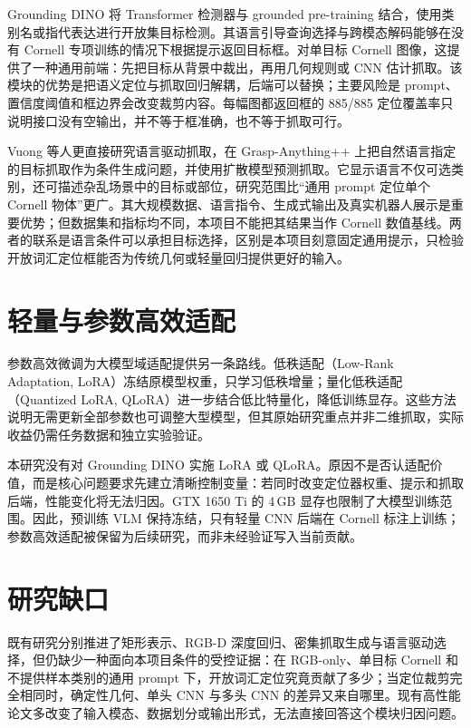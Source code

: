 \documentclass{l4proj}
\begin{document}
Grounding DINO 将 Transformer 检测器与 grounded pre-training 结合，使用类别名或指代表达进行开放集目标检测\citep{liu2023grounding}。其语言引导查询选择与跨模态解码能够在没有 Cornell 专项训练的情况下根据提示返回目标框。对单目标 Cornell 图像，这提供了一种通用前端：先把目标从背景中裁出，再用几何规则或 CNN 估计抓取。该模块的优势是把语义定位与抓取回归解耦，后端可以替换；主要风险是 prompt、置信度阈值和框边界会改变裁剪内容。每幅图都返回框的 885/885 定位覆盖率只说明接口没有空输出，并不等于框准确，也不等于抓取可行。

Vuong 等人更直接研究语言驱动抓取，在 Grasp-Anything++ 上把自然语言指定的目标抓取作为条件生成问题，并使用扩散模型预测抓取\citep{vuong2024language}。它显示语言不仅可选类别，还可描述杂乱场景中的目标或部位，研究范围比“通用 prompt 定位单个 Cornell 物体”更广。其大规模数据、语言指令、生成式输出及真实机器人展示是重要优势；但数据集和指标均不同，本项目不能把其结果当作 Cornell 数值基线。两者的联系是语言条件可以承担目标选择，区别是本项目刻意固定通用提示，只检验开放词汇定位框能否为传统几何或轻量回归提供更好的输入。

\section{轻量与参数高效适配}
参数高效微调为大模型域适配提供另一条路线。低秩适配（Low-Rank Adaptation, LoRA）冻结原模型权重，只学习低秩增量\citep{hu2021lora}；量化低秩适配（Quantized LoRA, QLoRA）进一步结合低比特量化，降低训练显存\citep{dettmers2023qlora}。这些方法说明无需更新全部参数也可调整大型模型，但其原始研究重点并非二维抓取，实际收益仍需任务数据和独立实验验证。

本研究没有对 Grounding DINO 实施 LoRA 或 QLoRA。原因不是否认适配价值，而是核心问题要求先建立清晰控制变量：若同时改变定位器权重、提示和抓取后端，性能变化将无法归因。GTX 1650 Ti 的 4\,GB 显存也限制了大模型训练范围。因此，预训练 VLM 保持冻结，只有轻量 CNN 后端在 Cornell 标注上训练；参数高效适配被保留为后续研究，而非未经验证写入当前贡献。

\section{研究缺口}
既有研究分别推进了矩形表示、RGB-D 深度回归、密集抓取生成与语言驱动选择，但仍缺少一种面向本项目条件的受控证据：在 RGB-only、单目标 Cornell 和不提供样本类别的通用 prompt 下，开放词汇定位究竟贡献了多少；当定位裁剪完全相同时，确定性几何、单头 CNN 与多头 CNN 的差异又来自哪里。现有高性能论文多改变了输入模态、数据划分或输出形式，无法直接回答这个模块归因问题。
\end{document}
